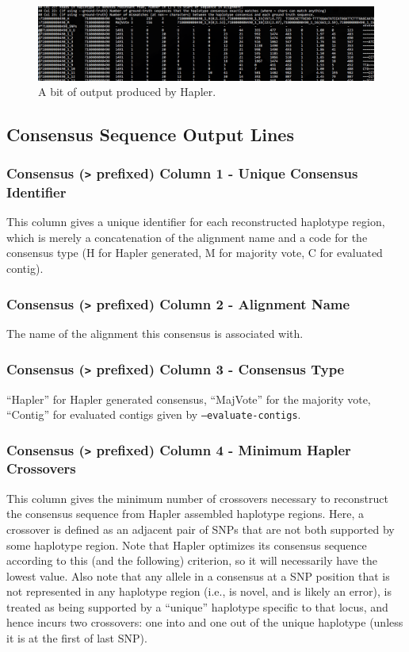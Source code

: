 \documentclass[11pt]{llncs}
\begin{document}
\begin{figure}[!h]
\centering
   \includegraphics[width=\textwidth]{graphics/hapler_output}
   \caption{A bit of output produced by Hapler.}
   \label{haplerOutput}
\end{figure}

\newpage
\subsection{Consensus Sequence Output Lines}

\subsubsection{Consensus (\texttt{>} prefixed) Column 1 - Unique Consensus Identifier}

This column gives a unique identifier for each reconstructed haplotype region, which is merely a concatenation of the alignment name and
a code for the consensus type (H for Hapler generated, M for majority vote, C for evaluated contig).


\subsubsection{Consensus (\texttt{>} prefixed) Column 2 - Alignment Name}

The name of the alignment this consensus is associated with.

\subsubsection{Consensus (\texttt{>} prefixed) Column 3 - Consensus Type}

``Hapler'' for Hapler generated consensus, ``MajVote'' for the majority vote, ``Contig'' for evaluated contigs given by \texttt{--evaluate-contigs}.

\subsubsection{Consensus (\texttt{>} prefixed) Column 4 - Minimum Hapler Crossovers}

This column gives the minimum number of crossovers necessary to reconstruct the consensus sequence from Hapler assembled haplotype regions. Here, a 
crossover is defined as an adjacent pair of SNPs that are not both supported by some haplotype region. Note that Hapler optimizes its consensus 
sequence according to this (and the following) criterion, so it will necessarily have the lowest value. Also note that any allele in a consensus at a 
SNP position that is not represented in any haplotype region (i.e., is novel, and is likely an error), is treated as being supported by a ``unique'' 
haplotype specific to that locus, and hence incurs two crossovers: one into and one out of the unique haplotype (unless it is at the first of last 
SNP).
\end{document}
